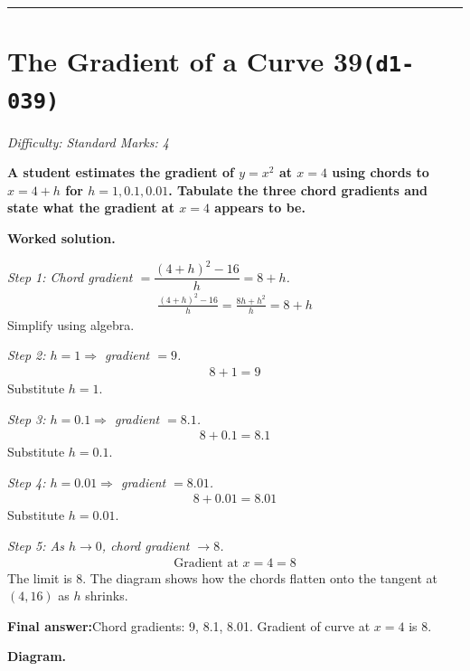 \documentclass[11pt]{article}
\newcommand{\question}[1]{\par\medskip\noindent\textbf{#1}\par}
\begin{document}
\medskip\hrule

\section*{The Gradient of a Curve 39\quad\small\texttt{(d1-039)}}
\textit{Difficulty: Standard \quad\textbar\quad Marks: 4}

\question{A student estimates the gradient of \( y = x^2 \) at \( x = 4 \) using chords to \( x = 4 + h \) for \( h = 1, 0.1, 0.01 \). Tabulate the three chord gradients and state what the gradient at \( x = 4 \) appears to be.}

\textbf{Worked solution.}

\textit{Step 1: Chord gradient \( = \dfrac{(4+h)^2 - 16}{h} = 8 + h \).}
\[\begin{gathered}
\frac{(4+h)^2 - 16}{h} = \frac{8h + h^2}{h} = 8 + h
\end{gathered}\]
Simplify using algebra.

\textit{Step 2: \( h = 1 \Rightarrow \) gradient \( = 9 \).}
\[\begin{gathered}
8 + 1 = 9
\end{gathered}\]
Substitute \( h = 1 \).

\textit{Step 3: \( h = 0.1 \Rightarrow \) gradient \( = 8.1 \).}
\[\begin{gathered}
8 + 0.1 = 8.1
\end{gathered}\]
Substitute \( h = 0.1 \).

\textit{Step 4: \( h = 0.01 \Rightarrow \) gradient \( = 8.01 \).}
\[\begin{gathered}
8 + 0.01 = 8.01
\end{gathered}\]
Substitute \( h = 0.01 \).

\textit{Step 5: As \( h \to 0 \), chord gradient \( \to 8 \).}
\[\begin{gathered}
\text{Gradient at } x = 4 = 8
\end{gathered}\]
The limit is 8. The diagram shows how the chords flatten onto the tangent at \( (4, 16) \) as \( h \) shrinks.

\begin{answerbox}
\textbf{Final answer:}\quad Chord gradients: 9, 8.1, 8.01. Gradient of curve at \(\displaystyle  x = 4 \) is 8.
\end{answerbox}
\textbf{Diagram.}
\end{document}
